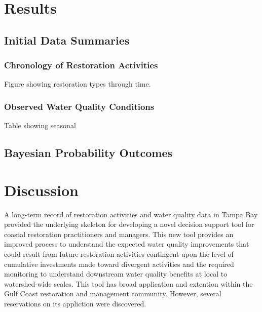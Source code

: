 \documentclass[]{article}
\begin{document}
\section{Results}\label{results}

\subsection{Initial Data Summaries}\label{initial-data-summaries}

\subsubsection{Chronology of Restoration
Activities}\label{chronology-of-restoration-activities}

Figure showing restoration types through time.

\subsubsection{Observed Water Quality
Conditions}\label{observed-water-quality-conditions}

Table showing seasonal

\subsection{Bayesian Probability
Outcomes}\label{bayesian-probability-outcomes}

\subsubsection{}\label{section}

\section{Discussion}\label{discussion}

A long-term record of restoration activities and water quality data in
Tampa Bay provided the underlying skeleton for developing a novel
decision support tool for coastal restoration practitioners and
managers. This new tool provides an improved process to understand the
expected water quality improvements that could result from future
restoration activities contingent upon the level of cumulative
investments made toward divergent activities and the required monitoring
to understand downstream water quality benefits at local to
watershed-wide scales. This tool has broad application and extention
within the Gulf Coast restoration and management community. However,
several reservations on its appliction were discovered.
\end{document}
